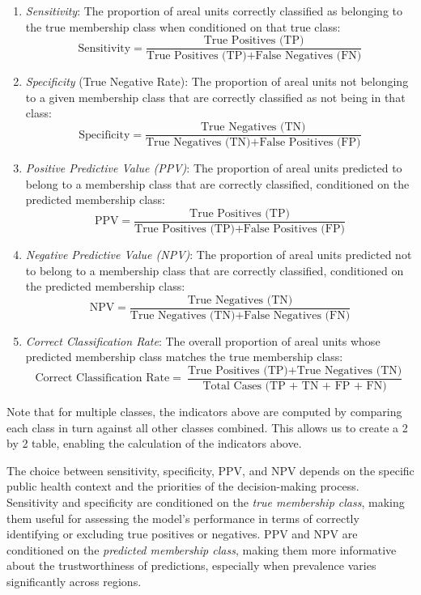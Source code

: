 \documentclass[
  letterpaper,
]{krantz}
\begin{document}
\begin{enumerate}
\def\labelenumi{\arabic{enumi}.}
\item
  \emph{Sensitivity}: The proportion of areal units correctly classified
  as belonging to the true membership class when conditioned on that
  true class:\\
  \[
  \text{Sensitivity} = \frac{\text{True Positives (TP)}}{\text{True Positives (TP)} + \text{False Negatives (FN)}}
  \]
\item
  \emph{Specificity} (True Negative Rate): The proportion of areal units
  not belonging to a given membership class that are correctly
  classified as not being in that class:\\
  \[
  \text{Specificity} = \frac{\text{True Negatives (TN)}}{\text{True Negatives (TN)} + \text{False Positives (FP)}}
  \]
\item
  \emph{Positive Predictive Value (PPV)}: The proportion of areal units
  predicted to belong to a membership class that are correctly
  classified, conditioned on the predicted membership class:\\
  \[
  \text{PPV} = \frac{\text{True Positives (TP)}}{\text{True Positives (TP)} + \text{False Positives (FP)}}
  \]
\item
  \emph{Negative Predictive Value (NPV)}: The proportion of areal units
  predicted not to belong to a membership class that are correctly
  classified, conditioned on the predicted membership class:\\
  \[
  \text{NPV} = \frac{\text{True Negatives (TN)}}{\text{True Negatives (TN)} + \text{False Negatives (FN)}}
  \]
\item
  \emph{Correct Classification Rate}: The overall proportion of areal
  units whose predicted membership class matches the true membership
  class:\\
  \[
  \text{Correct Classification Rate} = \frac{\text{True Positives (TP)} + \text{True Negatives (TN)}}{\text{Total Cases (TP + TN + FP + FN)}}
  \]
\end{enumerate}

Note that for multiple classes, the indicators above are computed by
comparing each class in turn against all other classes combined. This
allows us to create a 2 by 2 table, enabling the calculation of the
indicators above.

The choice between sensitivity, specificity, PPV, and NPV depends on the
specific public health context and the priorities of the decision-making
process. Sensitivity and specificity are conditioned on the \emph{true
membership class}, making them useful for assessing the model's
performance in terms of correctly identifying or excluding true
positives or negatives. PPV and NPV are conditioned on the
\emph{predicted membership class}, making them more informative about
the trustworthiness of predictions, especially when prevalence varies
significantly across regions.
\end{document}
